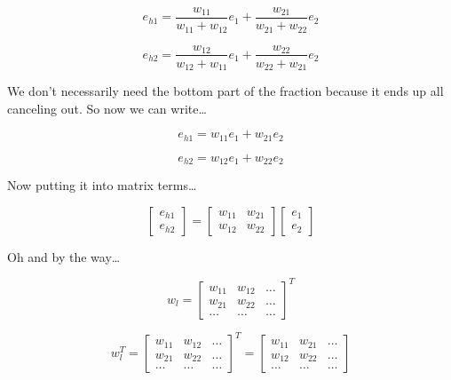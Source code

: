 \documentclass{article}
\begin{document}
    \begin{equation}
        e_{h1} = \frac{w_{11}}{w_{11}+w_{12}} e_{1} + \frac{w_{21}}{w_{21}+w_{22}} e_{2}
    \end{equation}

    \begin{equation}
        e_{h2} = \frac{w_{12}}{w_{12}+w_{11}} e_{1} + \frac{w_{22}}{w_{22}+w_{21}} e_{2}
    \end{equation}

    We don't necessarily need the bottom part of the fraction because it ends up all canceling out. So now we can write\dots
    
    \begin{equation}
        e_{h1} = w_{11}e_1+w_{21}e_2
    \end{equation}

    \begin{equation}
        e_{h2} = w_{12}e_1+w_{22}e_2
    \end{equation}

    Now putting it into matrix terms\dots

    \begin{equation}
        \begin{bmatrix}
            e_{h1} \\
            e_{h2}
        \end{bmatrix}
        =
        \begin{bmatrix}
            w_{11} & w_{21} \\
            w_{12} & w_{22}
        \end{bmatrix}
        \begin{bmatrix}
            e_1 \\
            e_2
        \end{bmatrix}
    \end{equation}

    Oh and by the way\dots

    \begin{equation}
        w_{l} = 
        \begin{bmatrix}
            w_{11} & w_{12} & \dots \\
            w_{21} & w_{22} & \dots \\
            \dots & \dots & \dots
        \end{bmatrix}^{T}
    \end{equation}

    \begin{equation}
        w_{l}^{T} = 
        \begin{bmatrix}
            w_{11} & w_{12} & \dots \\
            w_{21} & w_{22} & \dots \\
            \dots & \dots & \dots
        \end{bmatrix}^{T}
        = 
        \begin{bmatrix}
            w_{11} & w_{21} & \dots \\
            w_{12} & w_{22} & \dots \\
            \dots & \dots & \dots
        \end{bmatrix}
    \end{equation}
\end{document}
